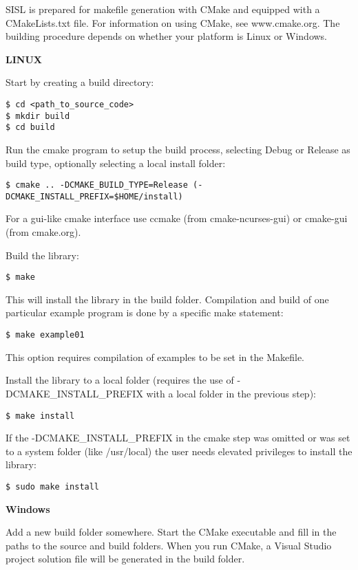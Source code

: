 SISL is prepared for makefile generation with CMake and equipped with a CMakeLists.txt file.
For information on using CMake, see www.cmake.org. The building procedure depends on whether your platform is
Linux or Windows.

\medskip
    {\noindent \bf LINUX}

Start by creating a build directory:
\begin{verbatim}
$ cd <path_to_source_code>
$ mkdir build
$ cd build
\end{verbatim}

Run the cmake program to setup the build process, selecting Debug or Release
as build type, optionally selecting a local install folder:
\begin{verbatim}
$ cmake .. -DCMAKE_BUILD_TYPE=Release (-DCMAKE_INSTALL_PREFIX=$HOME/install)
\end{verbatim}

For a gui-like cmake interface use ccmake (from cmake-ncurses-gui) or cmake-gui (from cmake.org).

Build the library:
\begin{verbatim}
$ make
\end{verbatim}
This will install the library in the build folder. Compilation and build of one particular
example program is done by a specific make statement:
\begin{verbatim}
$ make example01
\end{verbatim}
This option requires compilation of examples to be set in the Makefile.

Install the library to a local folder (requires the use of
-DCMAKE\_INSTALL\_PREFIX with a local folder in the previous step):
\begin{verbatim}
$ make install
\end{verbatim}

If the -DCMAKE\_INSTALL\_PREFIX in the cmake step was omitted or was set to a
system folder (like /usr/local) the user needs elevated privileges to install
the library:
\begin{verbatim}
$ sudo make install
\end{verbatim}

\medskip
{\noindent \bf Windows}

Add a new build folder somewhere. Start the CMake
executable and fill in the paths to the source and build folders. When
you run CMake, a Visual Studio project solution file will be generated
in the build folder.



